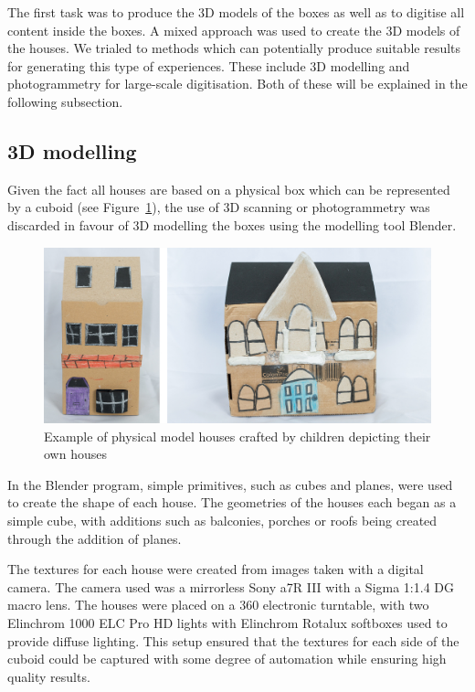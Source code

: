 \documentclass[acmlarge,screen,dvipsnames]{acmart}
\begin{document}
The first task was to produce the 3D models of the boxes as well as to
digitise all content inside the boxes. A mixed approach was used to create the
3D models of the houses. We trialed to methods which can potentially produce suitable results for generating this type of experiences. These include 3D modelling and photogrammetry for large-scale digitisation. Both of these will be explained in the following subsection.

\subsection{3D modelling}
Given the fact all houses are based on a physical box
which can be represented by a cuboid (see Figure~\ref{fig:boxes}), the use of
3D scanning or photogrammetry was discarded in favour of 3D modelling the
boxes using the modelling tool Blender\cite{blender}. 


\begin{figure}[ht] \centering
\includegraphics[width=\linewidth]{images/boxes.png} \caption{Example
of physical model houses crafted by children depicting their own houses}
\label{fig:boxes} \end{figure}

In the Blender program, simple primitives, such as cubes and planes, were used
to create the shape of each house. The geometries of the houses each began as
a simple cube, with additions such as balconies, porches or roofs being
created through the addition of planes.


The textures for each house were created from images taken with a digital
camera. The camera used was a mirrorless Sony a7R III with a Sigma 1:1.4 DG
macro lens. The houses were placed on a 360 electronic turntable, with two
Elinchrom 1000 ELC Pro HD lights with Elinchrom Rotalux softboxes used to
provide diffuse lighting. This setup ensured that the textures for each side
of the cuboid could be captured with some degree of automation while ensuring
high quality results.
 
\end{document}
